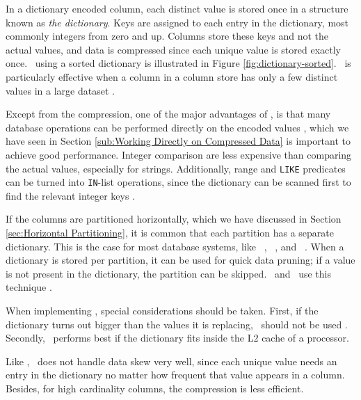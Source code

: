 
In a dictionary encoded column, each distinct value is stored once in a structure known as \textit{the dictionary}. Keys are assigned to each entry in the dictionary, most commonly integers from zero and up. Columns store these keys and not the actual values, and data is compressed since each unique value is stored exactly once. \de~using a sorted dictionary is illustrated in Figure \ref{fig:dictionary-sorted}. \de~is particularly effective when a column in a column store has only a few distinct values in a large dataset \cite{Faust2015-ke}.


Except from the compression, one of the major advantages of \de, is that many database operations can be performed directly on the encoded values \cite{Faust2015-ke}, which we have seen in Section \ref{sub:Working Directly on Compressed Data} is important to achieve good performance. Integer comparison are less expensive than comparing the actual values, especially for strings. Additionally, range and \texttt{LIKE} predicates can be turned into \texttt{IN}-list operations, since the dictionary can be scanned first to find the relevant integer keys \cite{Barber2012-xt}.

If the columns are partitioned horizontally, which we have discussed in Section \ref{sec:Horizontal Partitioning}, it is common that each partition has a separate dictionary. This is the case for most database systems, like \oracle~\cite{Lahiri2015-mz}, \blink~\cite{Barber2012-xt}, and \mssql~\cite{Larson2013-mc}. When a dictionary is stored per partition, it can be used for quick data pruning; if a value is not present in the dictionary, the partition can be skipped. \blink~and \monetx~use this technique \cite{Barber2012-xt, Boncz2005-wj}. 

When implementing \de, special considerations should be taken. First, if the dictionary turns out bigger than the values it is replacing, \de~should not be used \cite{Holloway2008-rr}. Secondly, \de~performs best if the dictionary fits inside the L2 cache of a processor.

Like \bp, \de~does not handle data skew very well, since each unique value needs an entry in the dictionary no matter how frequent that value appears in a column. Besides, for high cardinality columns, the compression is less efficient.

